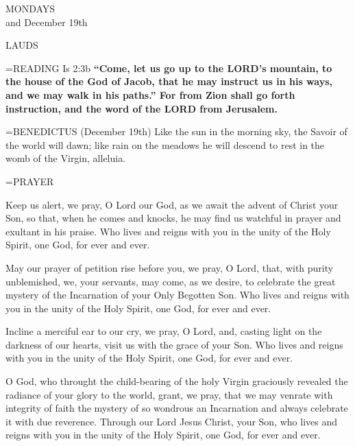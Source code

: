 \begin{center}\normalsize MONDAYS\\
\footnotesize and December 19th\\
\end{center}

\begin{flushleft}\normalsize LAUDS\\\end{flushleft}

\hangindent=\parindent \small{\uppercase{READING}} Is 2:3b \textbf{“Come, let us go up to the LORD’s mountain, to the house of the God of Jacob, that he may instruct us in his ways, and we may walk in his paths.” For from Zion shall go forth instruction, and the word of the LORD from Jerusalem.\\}

\hangindent=\parindent \small{BENEDICTUS  (December 19th) Like the sun in the morning sky, the Savoir of the world will dawn; like rain on the meadows he will descend to rest in the womb of the Virgin, alleluia.\\}

\hangindent=\parindent \small PRAYER
\begin{description}[labelindent=\parindent, leftmargin=*]
\item [Week 1:]  Keep us alert, we pray, O Lord our God, as we await the advent of Christ your Son, so that, when he comes and knocks, he may find us watchful in prayer and exultant in his praise. Who lives and reigns with you in the unity of the Holy Spirit, one God, for ever and ever.
\item [Week 2:]  May our prayer of petition rise before you, we pray, O Lord, that, with purity unblemished, we, your servants, may come, as we desire, to celebrate the great mystery of the Incarnation of your Only Begotten Son. Who lives and reigns with you in the unity of the Holy Spirit, one God, for ever and ever.
\item [Week 3:]  Incline a merciful ear to our cry, we pray, O Lord, and, casting light on the darkness of our hearts, visit us with the grace of your Son. Who lives and reigns with you in the unity of the Holy Spirit, one God, for ever and ever.
\item [December 19th:]  O God, who throught the child-bearing of the holy Virgin graciously revealed the radiance of your glory to the world, grant, we pray, that we may venrate with integrity of faith the mystery of so wondrous an Incarnation and always celebrate it with due reverence. Through our Lord Jesus Christ, your Son, who lives and reigns with you in the unity of the Holy Spirit, one God, for ever and ever.
\end{description}

